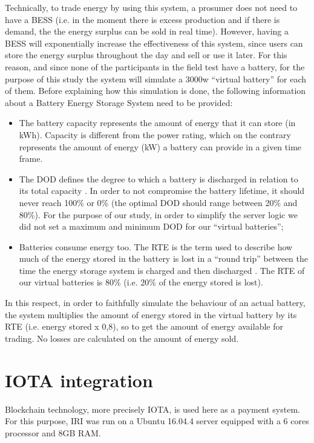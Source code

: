 Technically, to trade energy by using this system, a prosumer does not need to have a \ac{BESS} (i.e. in the moment there is excess production and if there is demand, the the energy surplus can be sold in real time). However, having a \ac{BESS} will exponentially increase the effectiveness of this system, since users can store the energy surplus throughout the day and sell or use it later. For this reason, and since none of the participants in the field test have a battery, for the purpose of this study the system will simulate a 3000w “virtual battery” for each of them. Before explaining how this simulation is done, the following  information about a Battery Energy Storage System need to be provided:
\begin{itemize}
    \item The battery capacity represents the amount of energy that it can store (in kWh). Capacity is different from the power rating, which on the contrary represents the amount of energy (kW) a battery can provide in a given time frame.
    \item The \ac{DOD} defines the degree to which a battery is discharged in relation to its total capacity . In order to not compromise the battery lifetime, it should never reach 100\% or 0\% (the optimal \ac{DOD} should range between 20\% and 80\%). For the purpose of our study, in order to simplify the server logic we did not set a maximum and minimum \ac{DOD} for our “virtual batteries”;
    \item Batteries consume energy too. The \ac{RTE} is the term used to describe how much of the energy stored in the battery is lost in a “round trip” between the time the energy storage system is charged and then discharged \cite{energymag}. The \ac{RTE} of our virtual batteries is 80\% (i.e. 20\% of the energy stored is lost).
\end{itemize}

In this respect, in order to faithfully simulate the behaviour of an actual battery, the system  multiplies the amount of energy stored in the virtual battery by its \ac{RTE} (i.e. energy stored x 0,8), so to get the amount of energy available for trading. No losses are calculated on the amount of energy sold.
\section{IOTA integration} \label{ii}
Blockchain technology, more precisely IOTA, is used here as a payment system. For this purpose, \ac{IRI} was run on a Ubuntu 16.04.4 server equipped with a 6 cores processor and 8GB RAM.



